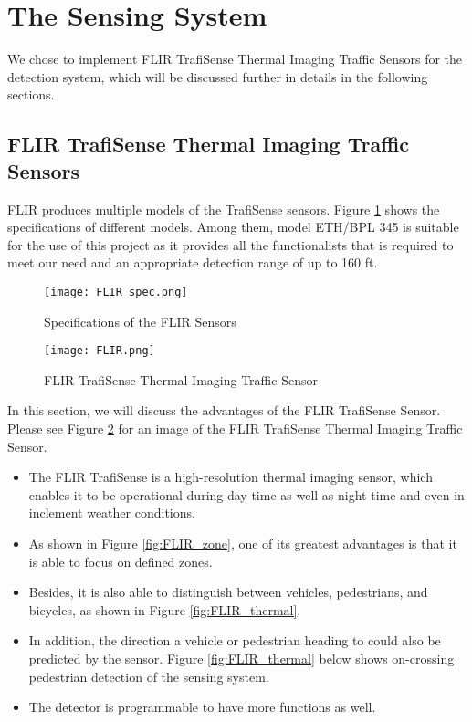 \documentclass{article}
\begin{document}
\section{The Sensing System}
We chose to implement FLIR TrafiSense Thermal Imaging Traffic Sensors for the detection system, which will be discussed further in details in the following sections.

\subsection{FLIR TrafiSense Thermal Imaging Traffic Sensors}
FLIR produces multiple models of the TrafiSense sensors. Figure \ref{fig:FLIR_spec} shows the specifications of different models. Among them, model ETH/BPL 345 is suitable for the use of this project as it provides all the functionalists that is required to meet our need and an appropriate detection range of up to 160 ft.

\begin{figure}
    \centering
    \texttt{[image: FLIR\_spec.png]}
    \caption{Specifications of the FLIR Sensors}
    \label{fig:FLIR_spec}
\end{figure}

\begin{figure}
    \centering
    \texttt{[image: FLIR.png]}
    \caption{FLIR TrafiSense Thermal Imaging Traffic Sensor}
    \label{fig:FLIR}
\end{figure}

In this section, we will discuss the advantages of the FLIR TrafiSense Sensor. Please see Figure \ref{fig:FLIR} for an image of the FLIR TrafiSense Thermal Imaging Traffic Sensor.
\begin{itemize}
\item The FLIR TrafiSense is a high-resolution thermal imaging sensor, which enables it to be operational during day time as well as night time and even in inclement weather conditions.
\item As shown in Figure \ref{fig:FLIR_zone}, one of its greatest advantages is that it is able to focus on defined zones.
\item Besides, it is also able to distinguish between vehicles, pedestrians, and bicycles, as shown in Figure \ref{fig:FLIR_thermal}.
\item In addition, the direction a vehicle or pedestrian heading to could also be predicted by the sensor. Figure \ref{fig:FLIR_thermal} below shows on-crossing pedestrian detection of the sensing system.
\item The detector is programmable to have more functions as well.
\end{itemize}
\end{document}
